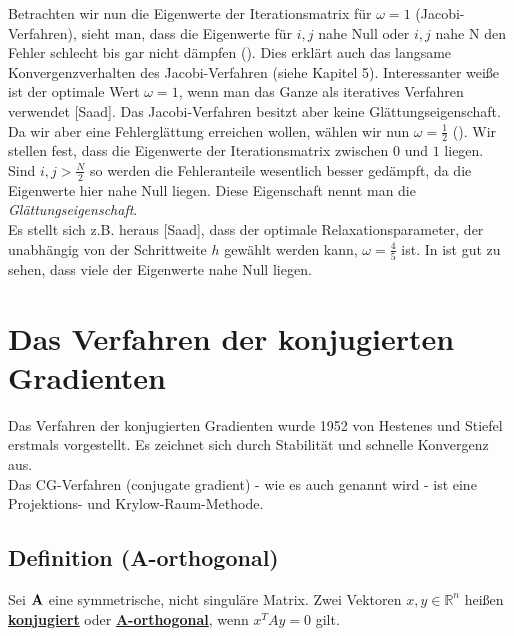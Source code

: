 
Betrachten wir nun die Eigenwerte der Iterationsmatrix für $\omega = 1$ (Jacobi-Verfahren), sieht man, dass die Eigenwerte für $i,j$ nahe Null oder $i,j$ nahe N den Fehler schlecht bis gar nicht dämpfen (). Dies erklärt auch das langsame Konvergenzverhalten des Jacobi-Verfahren (siehe Kapitel 5). Interessanter weiße ist der optimale Wert $\omega = 1$, wenn man das Ganze als iteratives Verfahren verwendet [Saad]. Das Jacobi-Verfahren besitzt aber keine Glättungseigenschaft.\\
Da wir aber eine Fehlerglättung erreichen wollen, wählen wir nun $\omega = \frac {1} {2}$ (). Wir stellen fest, dass die Eigenwerte der Iterationsmatrix zwischen $0$ und $1$ liegen. Sind $i,j > \frac {N} {2}$ so werden die Fehleranteile wesentlich besser gedämpft, da die Eigenwerte hier nahe Null liegen. Diese Eigenschaft nennt man die \textit{Glättungseigenschaft}.\\
Es stellt sich z.B. heraus [Saad], dass der optimale Relaxationsparameter, der unabhängig von der Schrittweite $h$ gewählt werden kann, $\omega = \frac {4} {5}$ ist. In  ist gut zu sehen, dass viele der Eigenwerte nahe Null liegen.


\section{Das Verfahren der konjugierten Gradienten}\label{s.Das Verfahren der konjugierten Gradienten}

Das Verfahren der konjugierten Gradienten wurde 1952 von Hestenes und Stiefel erstmals vorgestellt. Es zeichnet sich durch Stabilität und schnelle Konvergenz aus. \\
Das CG-Verfahren (conjugate gradient) - wie es auch genannt wird - ist eine Projektions- und Krylow-Raum-Methode.

\subsection{Definition (A-orthogonal)}\label{ss.A-orthogonal}
Sei ${\textbf{A}}$ eine symmetrische, nicht singuläre Matrix. Zwei Vektoren $x,y \in \mathbb{R}^{n}$ heißen \underline{\textbf{konjugiert}} oder \underline{\textbf{A-orthogonal}}, wenn $x^{T}Ay = 0$ gilt.

